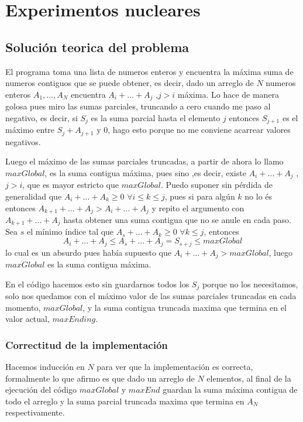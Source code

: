 \newpage{}
\section{Experimentos nucleares}
\subsection{Soluci\'on teorica del problema}
El programa toma una lista de numeros enteros y encuentra la m\'axima suma
de numeros contiguos que se puede obtener, es decir, dado un arreglo
de $N$ numeros enteros $A_1,\dots, A_N$ encuentra $A_i+\dots+A_j$ ,$j>i$ 
m\'axima. Lo hace de manera golosa pues miro las sumas parciales, truncando
a cero cuando me paso al negativo, es decir, si $S_j$ es la suma parcial 
hasta el elemento $j$ entonces $S_{j+1}$ es el m\'aximo entre $S_j+A_{j+1}$ 
y $0$, hago esto porque no me conviene acarrear valores negativos.


Luego el m\'aximo de las sumas parciales truncadas, a partir de ahora
lo llamo $maxGlobal$, es la suma contigua m\'axima, pues sino ,es decir, 
existe $A_i+\dots +A_j$ ,$j>i$, que es mayor estricto que $maxGlobal$. 
Puedo suponer sin p\'erdida de generalidad que $A_i+\dots +A_k\geq0$ 
$\forall i\leq k\leq j$, pues si para alg\'un $k$ no lo \'es entonces 
$A_{k+1}+\dots + A_j>A_i+\dots +A_j$ y repito el argumento con 
$A_{k+1}+ \dots +A_j$ hasta obtener una suma contigua que no se anule en 
cada paso. Sea $s$ el m\'inimo \'indice tal que $A_s+\dots+A_k\geq0$ 
$\forall k\leq j$, entonces
\begin{equation}
	A_i+\dots +A_j \leq A_s+\dots+A_j = S_{s+j} \leq maxGlobal
\end{equation}
lo cual es un absurdo pues hab\'ia supuesto que $A_i+\dots +A_j>maxGlobal$,
luego $maxGlobal$ es la suma contigua m\'axima.

En el c\'odigo hacemos esto sin guardarnos todos los $S_j$ porque no los 
necesitamos, solo nos quedamos con el m\'aximo valor de las sumas parciales
truncadas en cada momento, $maxGlobal$, y la suma contigua truncada maxima
que termina en el valor actual, $maxEnding$.

\subsubsection{Correctitud de la implementaci\'on}
Hacemos inducci\'on en $N$ para ver que la implementaci\'on es correcta, 
formalmente lo que afirmo es que dado un arreglo de $N$ elementos, al 
final de la ejecuci\'on del c\'odigo $maxGlobal$ y $maxEnd$ guardan la 
suma m\'axima contigua de todo el arreglo y la suma parcial truncada maxima
que termina en $A_N$ respectivamente.

